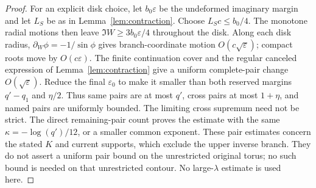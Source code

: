 \documentclass[11pt]{article}
\numberwithin{equation}{section}
\theoremstyle{definition}
\newcommand{\eps}{\varepsilon}
\begin{document}
\begin{proof}
For an explicit disk choice, let \(b_0\eps\) be the
undeformed imaginary margin and let \(L_S\) be as in
Lemma~\ref{lem:contraction}. Choose \(L_Sc\le b_0/4\).
The monotone radial motions then leave \(\Im W\ge3b_0\eps/4\)
throughout the disk. Along each disk radius,
\(\partial_W\phi=-1/\sin\phi\) gives branch-coordinate motion
\(O(c\sqrt\eps)\); compact roots move by \(O(c\eps)\).
The finite continuation cover and the regular canceled expression
of Lemma~\ref{lem:contraction} give a uniform complete-pair change
\(O(\sqrt\eps)\). Reduce the final \(\eps_0\) to make it
smaller than both reserved margins \(q'-q_1\) and \(\eta/2\).
Thus same pairs are at most \(q'\), cross pairs at most
\(1+\eta\), and named pairs are uniformly bounded.
The limiting cross supremum need not be strict. The direct
remaining-pair count proves the estimate with the same
\(\kappa=-\log(q')/12\), or a smaller common exponent.
These pair estimates concern the stated \(K\) and current
supports, which exclude the upper inverse branch. They do not
assert a uniform pair bound on the unrestricted original torus;
no such bound is needed on that unrestricted contour.
No large-\(\lambda\) estimate is used here.
\end{proof}
\end{document}
